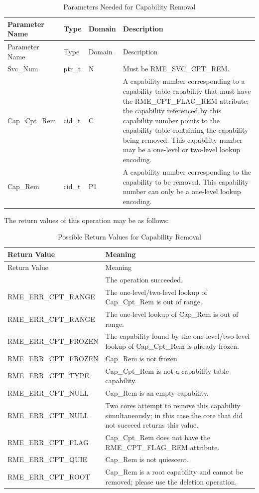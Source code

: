 \begin{xltabular}{\textwidth}{@{}>{\hsize\raggedright\arraybackslash}X>{\hsize\raggedright\arraybackslash}X>{\hsize\raggedright\arraybackslash}X>{\hsize\raggedright\arraybackslash}X@{}}
\caption{Parameters Needed for Capability Removal}\label{tab:2-13-capability-removal-parameters}\\
\toprule
Parameter Name & Type & Domain & Description\tabularnewline
\endfirsthead
\toprule
Parameter Name & Type & Domain & Description\tabularnewline
\midrule
\endhead
\bottomrule
\endlastfoot
Svc\_Num & ptr\_t & N & Must be RME\_SVC\_CPT\_REM.\tabularnewline
Cap\_Cpt\_Rem & cid\_t & C &
A capability number corresponding to a capability table capability that must have the RME\_CPT\_FLAG\_REM attribute; the capability referenced by this capability number points to the capability table containing the capability being removed. This capability number may be a one-level or two-level lookup encoding.\tabularnewline
Cap\_Rem & cid\_t & P1 &
A capability number corresponding to the capability to be removed. This capability number can only be a one-level lookup encoding.\tabularnewline
\end{xltabular}
\nopagebreak[4]

The return values of this operation may be as follows:

\begin{xltabular}{\textwidth}{@{}>{\hsize\raggedright\arraybackslash}X>{\hsize\raggedright\arraybackslash}X@{}}
\caption{Possible Return Values for Capability Removal}\label{tab:2-14-capability-removal-return-values}\\
\toprule
Return Value & Meaning\tabularnewline
\endfirsthead
\toprule
Return Value & Meaning\tabularnewline
\midrule
\endhead
\bottomrule
{} & The operation succeeded.\tabularnewline
    RME\_ERR\_CPT\_RANGE & The one-level/two-level lookup of Cap\_Cpt\_Rem is out of range.\tabularnewline
    RME\_ERR\_CPT\_RANGE & The one-level lookup of Cap\_Rem is out of range.\tabularnewline
    RME\_ERR\_CPT\_FROZEN & The capability found by the one-level/two-level lookup of Cap\_Cpt\_Rem is already frozen.\tabularnewline
    RME\_ERR\_CPT\_FROZEN & Cap\_Rem is not frozen.\tabularnewline
    RME\_ERR\_CPT\_TYPE & Cap\_Cpt\_Rem is not a capability table capability.\tabularnewline
    RME\_ERR\_CPT\_NULL & Cap\_Rem is an empty capability.\tabularnewline
    RME\_ERR\_CPT\_NULL & Two cores attempt to remove this capability simultaneously; in this case the core that did not succeed returns this value.\tabularnewline
    RME\_ERR\_CPT\_FLAG & Cap\_Cpt\_Rem does not have the RME\_CPT\_FLAG\_REM attribute.\tabularnewline
    RME\_ERR\_CPT\_QUIE & Cap\_Rem is not quiescent.\tabularnewline
    RME\_ERR\_CPT\_ROOT & Cap\_Rem is a root capability and cannot be removed; please use the deletion operation.\tabularnewline
\end{xltabular}
\nopagebreak[4]

